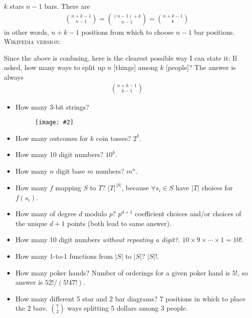 \documentclass[12pt]{article}
\newcommand\myfig[2][0.3\textwidth]{\begin{figure}[h!]\centering\texttt{[image: \#2]}\end{figure}}
\newcommand{\myspace}{\vspace{2\bigskipamount}}
\newcommand\p{\Needspace{12\baselineskip} \noindent}
\begin{document}
\p {} $k$ stars $n - 1$ bars. There are 
\begin{align}
{n+k-1 \choose n-1} = {(n - 1) + k \choose n-1}  = {n+k-1 \choose k} 
\end{align}
\textellipsis in other words, $n+k-1$ positions from which to choose $n-1$ bar positions. \textsc{Wikipedia version:}\\


Since the above is confusing, here is the clearest possible way I can state it: If asked, how many ways to split up $n$ [things] among $k$ [people]? The answer is always
\begin{align}
	\binom{n + k - 1}{k - 1}
\end{align}


\myspace 

\begin{itemize}
	\item How many 3-bit strings? \myfig{StringTree.PNG}
	\item How many outcomes for $k$ coin tosses? $2^k$. 
	\item How many 10 digit numbers? $10^k$. 
	\item How many $n$ digit base $m$ numbers? $m^n$. 
	\item How many  $f$ mapping $S$ to $T$? $|T|^{|S|}$, because $\forall s_i \in S$ have $|T|$ choices for $f(s_i)$. 
	\item How many  of degree $d$ modulo $p$? $p^{d + 1}$ coefficient choices and/or choices of the unique $d+1$ points (both lead to same answer). 
	\item How many 10 digit numbers \textit{without repeating a digit?}. $10 \times 9 \times \cdots \times 1 = 10!$. 
	\item How many 1-to-1 functions from $|S|$ to $|S|$? $|S|!$. 
	\item How many poker hands? Number of orderings for a given poker hand is $5!$, so answer is $52!/(5!47!)$. 
	\item How many different 5 star and 2 bar diagrams? 7 positions in which to place the $2$ bars. ${7 \choose 2}$ ways splitting $5$ dollars among 3 people. 
	
\end{itemize}
\end{document}
